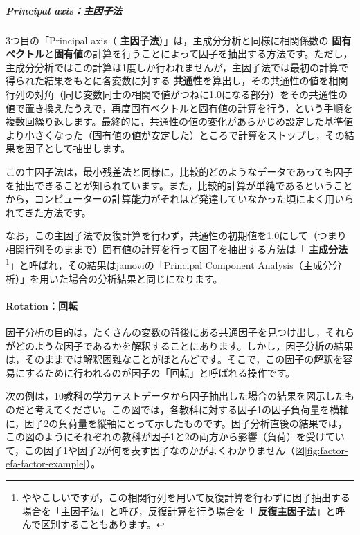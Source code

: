 \documentclass[
  12pt,
  a5jpaper,
  lualatex, ja=standard]{bxjsbook}
\renewcommand{\emph}[1]{\textbf{\color{emph} #1}}
\begin{document}
\hypertarget{principal-axisux4e3bux56e0ux5b50ux6cd5}{%
\subparagraph*{Principal axis：主因子法}\label{principal-axisux4e3bux56e0ux5b50ux6cd5}}

3つ目の「Principal axis（\emph{主因子法}）」は，主成分分析と同様に相関係数の\emph{固有ベクトル}と\textbf{固有値}の計算を行うことによって因子を抽出する方法です。ただし，主成分分析ではこの計算は1度しか行われませんが，主因子法では最初の計算で得られた結果をもとに各変数に対する\emph{共通性}を算出し，その共通性の値を相関行列の対角（同じ変数同士の相関で値がつねに1.0になる部分）をその共通性の値で置き換えたうえで，再度固有ベクトルと固有値の計算を行う，という手順を複数回繰り返します。最終的に，共通性の値の変化があらかじめ設定した基準値より小さくなった（固有値の値が安定した）ところで計算をストップし，その結果を因子として抽出します。

この主因子法は，最小残差法と同様に，比較的どのようなデータであっても因子を抽出できることが知られています。また，比較的計算が単純であるということから，コンピューターの計算能力がそれほど発達していなかった頃によく用いられてきた方法です。

なお，この主因子法で反復計算を行わず，共通性の初期値を1.0にして（つまり相関行列そのままで）固有値の計算を行って因子を抽出する方法は「\emph{主成分法}\footnote{ややこしいですが，この相関行列を用いて反復計算を行わずに因子抽出する場合を「主因子法」と呼び，反復計算を行う場合を「\emph{反復主因子法}」と呼んで区別することもあります。}」と呼ばれ，その結果はjamoviの「Principal Component Analysis（主成分分析）」を用いた場合の分析結果と同じになります。

\hypertarget{subsub:factor-fa-rotation}{%
\paragraph*{Rotation：回転}\label{subsub:factor-fa-rotation}}

因子分析の目的は，たくさんの変数の背後にある共通因子を見つけ出し，それらがどのような因子であるかを解釈することにあります。しかし，因子分析の結果は，そのままでは解釈困難なことがほとんどです。そこで，この因子の解釈を容易にするために行われるのが因子の「回転」と呼ばれる操作です。

次の例は，10教科の学力テストデータから因子抽出した場合の結果を図示したものだと考えてください。この図では，各教科に対する因子1の因子負荷量を横軸に，因子2の負荷量を縦軸にとって示したものです。因子分析直後の結果では，この図のようにそれぞれの教科が因子1と2の両方から影響（負荷）を受けていて，この因子1や因子2が何を表す因子なのかがよくわかりません（図\ref{fig:factor-efa-factor-example}）。
\end{document}
